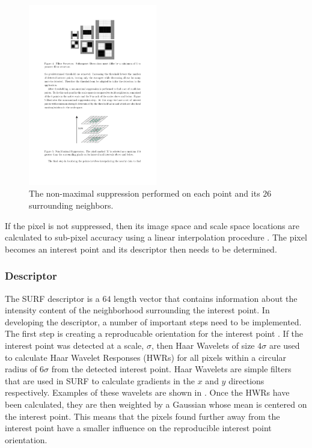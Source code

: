 \documentclass[11pt]{report}
\begin{document}
\begin{figure}[h!] 
  \centering
    \includegraphics[width=0.5\textwidth]{../Drawings/methods/SURF2D_Nonmaximal_suppression.pdf}
    \caption{The non-maximal suppression performed on each point and its $26$ surrounding neighbors.}
    \label{fig:imageSpace}
\end{figure}

If the pixel is not suppressed, then its image space and scale space locations are calculated to sub-pixel accuracy using a linear interpolation procedure \cite{Evans2009}. The pixel becomes an interest point and its descriptor then needs to be determined.\\


\subsubsection{Descriptor}
\label{sec:2dsurfdescribe}
The SURF descriptor is a $64$ length vector that contains information about the intensity content of the neighborhood surrounding the interest point. In developing the descriptor, a number of important steps need to be implemented. The first step is creating a reproducable orientation for the interest point \cite{Bay2008}. If the interest point was detected at a scale, $\sigma$, then Haar Wavelets of size $4\sigma$ are used to calculate Haar Wavelet Responses (HWRs) for all pixels within a circular radius of $6\sigma$ from the detected interest point.  Haar Wavelets are simple filters that are used in SURF to calculate gradients in the $x$ and $y$ directions respectively. Examples of these wavelets are shown in  \cite{Evans2009}. Once the HWRs have been calculated, they are then weighted by a Gaussian whose mean is centered on the interest point. This means that the pixels found further away from the interest point have a smaller influence on the reproducible interest point orientation.\\
\end{document}
